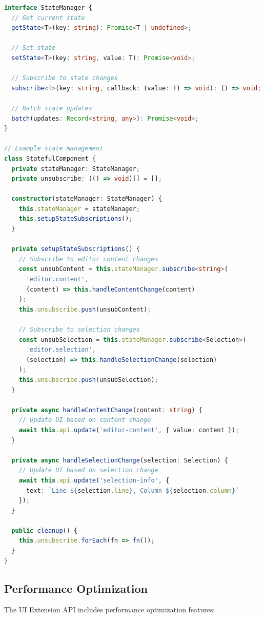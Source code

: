 \begin{lstlisting}[language=TypeScript,caption={State Management}]
interface StateManager {
  // Get current state
  getState<T>(key: string): Promise<T | undefined>;
  
  // Set state
  setState<T>(key: string, value: T): Promise<void>;
  
  // Subscribe to state changes
  subscribe<T>(key: string, callback: (value: T) => void): () => void;
  
  // Batch state updates
  batch(updates: Record<string, any>): Promise<void>;
}

// Example state management
class StatefulComponent {
  private stateManager: StateManager;
  private unsubscribe: (() => void)[] = [];
  
  constructor(stateManager: StateManager) {
    this.stateManager = stateManager;
    this.setupStateSubscriptions();
  }
  
  private setupStateSubscriptions() {
    // Subscribe to editor content changes
    const unsubContent = this.stateManager.subscribe<string>(
      'editor.content',
      (content) => this.handleContentChange(content)
    );
    this.unsubscribe.push(unsubContent);
    
    // Subscribe to selection changes
    const unsubSelection = this.stateManager.subscribe<Selection>(
      'editor.selection',
      (selection) => this.handleSelectionChange(selection)
    );
    this.unsubscribe.push(unsubSelection);
  }
  
  private async handleContentChange(content: string) {
    // Update UI based on content change
    await this.api.update('editor-content', { value: content });
  }
  
  private async handleSelectionChange(selection: Selection) {
    // Update UI based on selection change
    await this.api.update('selection-info', { 
      text: `Line ${selection.line}, Column ${selection.column}` 
    });
  }
  
  public cleanup() {
    this.unsubscribe.forEach(fn => fn());
  }
}
\end{lstlisting}

\subsection*{Performance Optimization}

The UI Extension API includes performance optimization features:

